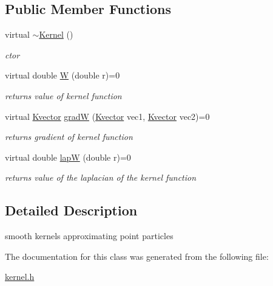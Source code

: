 \subsection*{\-Public \-Member \-Functions}
\begin{DoxyCompactItemize}
\item 
\hypertarget{classKernel_ab0aee98e27b5f821688faad456185b43}{virtual \hyperlink{classKernel_ab0aee98e27b5f821688faad456185b43}{$\sim$\-Kernel} ()}\label{classKernel_ab0aee98e27b5f821688faad456185b43}

\begin{DoxyCompactList}\small\item\em ctor \end{DoxyCompactList}\item 
\hypertarget{classKernel_abdb6d8bdaf6f167019425a067d49bf19}{virtual double \hyperlink{classKernel_abdb6d8bdaf6f167019425a067d49bf19}{\-W} (double r)=0}\label{classKernel_abdb6d8bdaf6f167019425a067d49bf19}

\begin{DoxyCompactList}\small\item\em returns value of kernel function \end{DoxyCompactList}\item 
\hypertarget{classKernel_ae252a58c618b333516e38e780aa9eb04}{virtual \hyperlink{structKvector}{\-Kvector} \hyperlink{classKernel_ae252a58c618b333516e38e780aa9eb04}{grad\-W} (\hyperlink{structKvector}{\-Kvector} vec1, \hyperlink{structKvector}{\-Kvector} vec2)=0}\label{classKernel_ae252a58c618b333516e38e780aa9eb04}

\begin{DoxyCompactList}\small\item\em returns gradient of kernel function \end{DoxyCompactList}\item 
\hypertarget{classKernel_ad2adf6c83967929de6a3f4a6911554c2}{virtual double \hyperlink{classKernel_ad2adf6c83967929de6a3f4a6911554c2}{lap\-W} (double r)=0}\label{classKernel_ad2adf6c83967929de6a3f4a6911554c2}

\begin{DoxyCompactList}\small\item\em returns value of the laplacian of the kernel function \end{DoxyCompactList}\end{DoxyCompactItemize}


\subsection{\-Detailed \-Description}
smooth kernels approximating point particles 

\-The documentation for this class was generated from the following file\-:\begin{DoxyCompactItemize}
\item 
\hyperlink{kernel_8h}{kernel.\-h}\end{DoxyCompactItemize}
